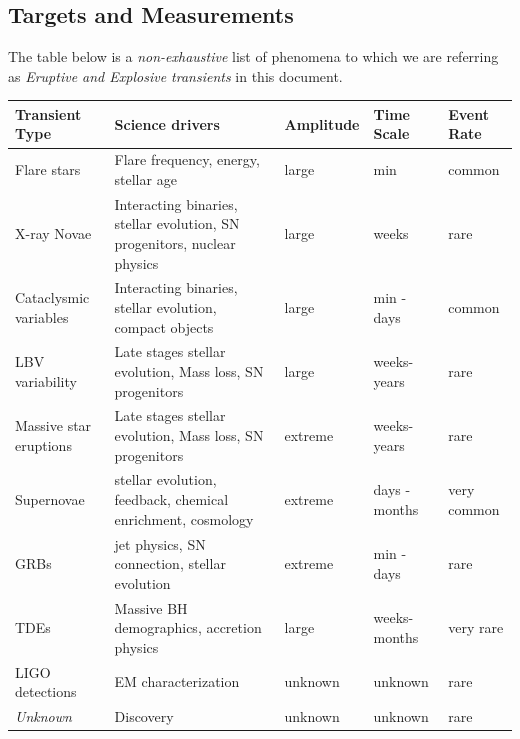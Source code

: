 \subsection{Targets and Measurements}
\label{sec:\chpname:targets}

The table below is a \emph{non-exhaustive} list of
phenomena to which we are referring as \emph{Eruptive and Explosive
  transients} in this document.

\begin{center}
  \begin{tabular}{| p{4.5cm} | p{6.0cm} | l | l | p{0.5cm}|}
    \hline

    Transient Type & Science drivers & Amplitude & Time Scale & Event Rate\\
\hline

Flare stars & Flare frequency, energy, stellar age & large & min & common\\

X-ray Novae & Interacting binaries, stellar evolution, SN progenitors,
nuclear physics & large & weeks & rare\\

Cataclysmic variables & Interacting binaries, stellar evolution, compact
objects & large & min - days & common\\

LBV variability & Late stages stellar evolution, Mass loss, SN progenitors
& large & weeks-years & rare \\

Massive star eruptions & Late stages stellar evolution, Mass loss, SN progenitors & extreme & weeks-years & rare\\

Supernovae & stellar evolution, feedback, chemical enrichment, cosmology & extreme & days - months & very common\\

GRBs & jet physics, SN connection, stellar evolution & extreme & min - days
& rare\\

TDEs & Massive BH demographics, accretion physics & large & weeks-months & very rare\\


LIGO detections & EM characterization & unknown & unknown & rare\\

\emph{Unknown} & Discovery & unknown & unknown & rare\\

 \hline \end{tabular}
\end{center}

